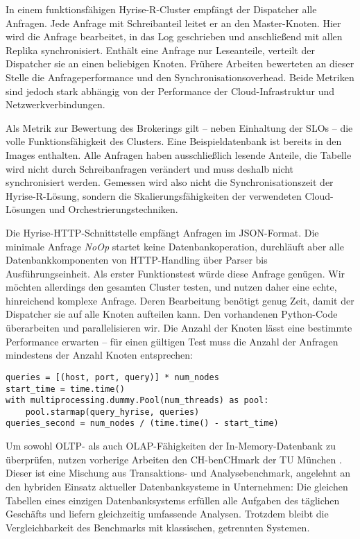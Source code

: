 In einem funktionsfähigen Hyrise-R-Cluster empfängt der Dispatcher alle Anfragen. Jede Anfrage mit Schreibanteil leitet er an den Master-Knoten. Hier wird die Anfrage bearbeitet, in das Log geschrieben und anschließend mit allen Replika synchronisiert. Enthält eine Anfrage nur Leseanteile, verteilt der Dispatcher sie an einen beliebigen Knoten. Frühere Arbeiten bewerteten an dieser Stelle die Anfrageperformance und den Synchronisationsoverhead. Beide Metriken sind jedoch stark abhängig von der Performance der Cloud-Infrastruktur und Netzwerkverbindungen.

Als Metrik zur Bewertung des Brokerings gilt -- neben Einhaltung der SLOs -- die volle Funktionsfähigkeit des Clusters. Eine Beispieldatenbank ist bereits in den Images enthalten. Alle Anfragen haben ausschließlich lesende Anteile, die Tabelle wird nicht durch Schreibanfragen verändert und muss deshalb nicht synchronisiert werden. Gemessen wird also nicht die Synchronisationszeit der Hyrise-R-Lösung, sondern die Skalierungsfähigkeiten der verwendeten Cloud-Lösungen und Orchestrierungstechniken.

Die Hyrise-HTTP-Schnittstelle empfängt Anfragen im JSON-Format. Die minimale Anfrage \emph{NoOp} startet keine Datenbankoperation, durchläuft aber alle Datenbankkomponenten von HTTP-Handling über Parser bis Ausführungseinheit. Als erster Funktionstest würde diese Anfrage genügen. Wir möchten allerdings den gesamten Cluster testen, und nutzen daher eine echte, hinreichend komplexe Anfrage. Deren Bearbeitung benötigt genug Zeit, damit der Dispatcher sie auf alle Knoten aufteilen kann. Den vorhandenen Python-Code überarbeiten und parallelisieren wir. Die Anzahl der Knoten lässt eine bestimmte Performance erwarten -- für einen gültigen Test muss die Anzahl der Anfragen mindestens der Anzahl Knoten entsprechen:

\begin{verbatim}
queries = [(host, port, query)] * num_nodes
start_time = time.time()
with multiprocessing.dummy.Pool(num_threads) as pool:
	pool.starmap(query_hyrise, queries)
queries_second = num_nodes / (time.time() - start_time)
\end{verbatim}

Um sowohl OLTP- als auch OLAP-Fähigkeiten der In-Memory-Datenbank zu überprüfen, nutzen vorherige Arbeiten \cite{ssiclops:d42:experiments-measurements} den CH-benCHmark der TU München \cite{cole:2011:db-benchmark}. Dieser ist eine Mischung aus Transaktions- und Analysebenchmark, angelehnt an den hybriden Einsatz aktueller Datenbanksysteme in Unternehmen: Die gleichen Tabellen eines einzigen Datenbanksystems erfüllen alle Aufgaben des täglichen Geschäfts und liefern gleichzeitig umfassende Analysen. Trotzdem bleibt die Vergleichbarkeit des Benchmarks mit klassischen, getrennten Systemen.

